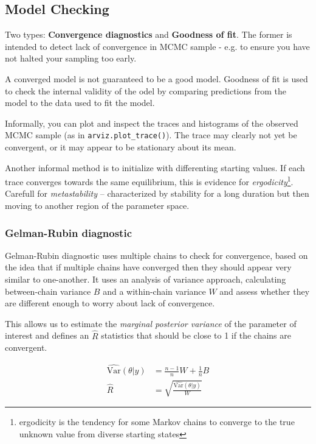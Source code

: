 \documentclass[12pt]{article}
\begin{document}
\subsection{Model Checking}

Two types: {\bf Convergence diagnostics} and {\bf Goodness of fit}. The former
is intended to detect lack of convergence in MCMC sample - e.g. to ensure you
have not halted your sampling too early.

A converged model is not guaranteed to be a good model. Goodness of fit is used
to check the internal validity of the odel by comparing predictions from the
model to the data used to fit the model.

Informally, you can plot and inspect the traces and histograms of the observed
MCMC sample (as in {\tt arviz.plot\_trace()}). The trace may clearly not yet be
convergent, or it may appear to be stationary about its mean.

Another informal method is to initialize with differenting starting values. If
each trace converges towards the same equilibrium, this is evidence for {\sl
  ergodicity}\footnote{ergodicity is the tendency for some Markov chains to converge to the true
unknown value from diverse starting states}. Carefull for {\sl metastability} --
characterized by stability for a long duration but then moving to another region
of the parameter space.

\subsubsection{Gelman-Rubin diagnostic}

Gelman-Rubin diagnostic uses multiple chains to check for convergence, based on
the idea that if multiple chains have converged then they should appear very
similar to one-another. It uses an analysis of variance approach, calculating
between-chain variance $B$ and a within-chain variance $W$ and assess whether
they are different enough to worry about lack of convergence.

This allows us to estimate the {\sl marginal posterior variance} of the
parameter of interest and defines an $\hat R$ statistics that should be close to 1 if the chains are
convergent.

\begin{align*}
    \widehat{ \text{Var}}(\theta | y) &= \frac{n-1}{n} W + \frac{1}{n} B\\[2ex]
  \hat{R} &= \sqrt{\frac{\widehat{\text{Var}}(\theta | y)}{W}}
\end{align*}
\end{document}
